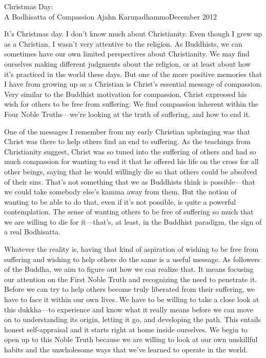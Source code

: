 {Christmas Day:\\A Bodhisatta of Compassion}
{Ajahn Karuṇadhammo}{December 2012}

It's Christmas day. I don't know much about Christianity. Even though I 
grew up as a Christian, I wasn't very attentive to the religion. As 
Buddhists, we can sometimes have our own limited perspectives about 
Christianity. We may find ourselves making different judgments about 
the religion, or at least about how it's practiced in the world these 
days. But one of the more positive memories that I have from growing up 
as a Christian is Christ's essential message of compassion. Very 
similar to the Buddhist motivation for compassion, Christ expressed his 
wish for others to be free from suffering. We find compassion inherent 
within the Four Noble Truths---we're looking at the truth of suffering, 
and how to end it.

One of the messages I remember from my early Christian upbringing was 
that Christ was there to help others find an end to suffering. As the 
teachings from Christianity suggest, Christ was so tuned into the 
suffering of others and had so much compassion for wanting to end it 
that he offered his life on the cross for all other beings, saying that 
he would willingly die so that others could be absolved of their sins. 
That's not something that we as Buddhists think is possible---that we 
could take somebody else's kamma away from them. But the notion of 
wanting to be able to do that, even if it's not possible, is quite a 
powerful contemplation. The sense of wanting others to be free of 
suffering so much that we are willing to die for it---that's, at least, 
in the Buddhist paradigm, the sign of a real Bodhisatta.

Whatever the reality is, having that kind of aspiration of wishing to 
be free from suffering and wishing to help others do the same is a 
useful message. As followers of the Buddha, we aim to figure out how we 
can realize that. It means focusing our attention on the First Noble 
Truth and recognizing the need to penetrate it. Before we can try to 
help others become truly liberated from their suffering, we have to 
face it within our own lives. We have to be willing to take a close 
look at this dukkha---to experience and know what it really means 
before we can move on to understanding its origin, letting it go, and 
developing the path. This entails honest self-appraisal and it starts 
right at home inside ourselves. We begin to open up to this Noble Truth 
because we are willing to look at our own unskillful habits and the 
unwholesome ways that we've learned to operate in the world.

